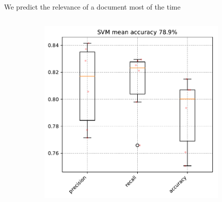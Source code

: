 \documentclass[9pt]{beamer}
\begin{document}
\begin{frame}{We predict the relevance of a document most of the time}
\begin{figure}
	\begin{columns}
		\begin{column}{0.3812\linewidth}
			\begin{figure}
					\includegraphics[width=\linewidth]{../plots/prediction_models/relevance_prediction_2020-05-12.pdf}
			\end{figure}
			\begin{figure}

\end{figure}
\end{column}
\end{columns}
\end{figure}
\end{frame}
\end{document}
